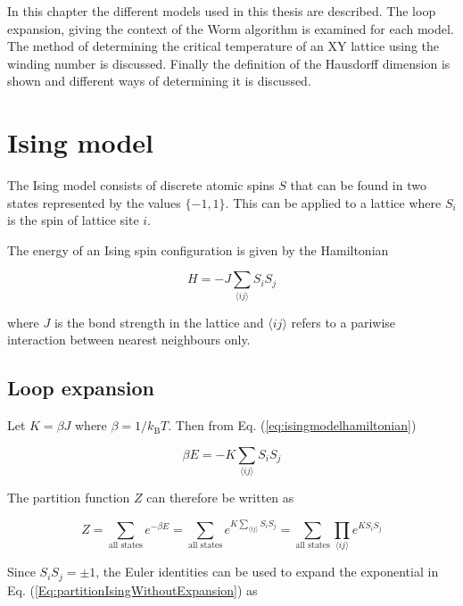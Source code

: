 In this chapter the different models used in this thesis are described. The loop expansion, giving the context of the Worm algorithm is examined for each model. The method of determining the critical temperature of an XY lattice using the winding number is discussed. Finally the definition of the Hausdorff dimension is shown and different ways of determining it is discussed.

\section{Ising model}

The Ising model consists of discrete atomic spins $S$ that can be found in two states represented by the values $\{-1, 1\}$. This can be applied to a lattice where $S_i$ is the spin of lattice site $i$.

The energy of an Ising spin configuration is given by the Hamiltonian

\begin{equation}
    H = - J \sum_{\langle ij \rangle} S_i S_j
\label{eq:isingmodelhamiltonian}
\end{equation}

\noindent where $J$ is the bond strength in the lattice and $\langle ij \rangle$ refers to a pariwise interaction between nearest neighbours only.

\newpage

\subsection{Loop expansion}
\label{subsec:IsingLoopExpansion}

Let $K = \beta J$ where $\beta = 1/k_{\text{B}} T$. Then from Eq. (\ref{eq:isingmodelhamiltonian})

\begin{equation}
    \beta E = - K \sum_{\langle ij \rangle} S_i S_j
\end{equation}

The partition function $Z$ can therefore be written as

\begin{equation}
    Z = \sum_{\text{all states}} e^{-\beta E} = \sum_{\text{all states}} e^{K \sum_{\langle ij \rangle} S_i S_j} = \sum_{\text{all states}} \prod_{\langle ij \rangle} e^{K S_i S_j}
\label{Eq:partitionIsingWithoutExpansion}
\end{equation}

Since $S_i S_j = \pm 1$, the Euler identities can be used to expand the exponential in Eq. (\ref{Eq:partitionIsingWithoutExpansion}) as

